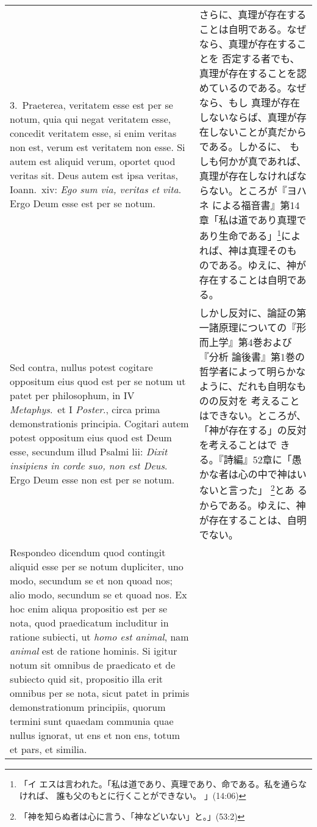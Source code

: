 \documentclass[10pt]{jsarticle}
\begin{document}
\begin{longtable}{p{21em}p{21em}}
\\

3.~{\sc Praeterea}, veritatem esse est per se notum, quia qui negat
veritatem esse, concedit veritatem esse, si enim veritas non est,
verum est veritatem non esse. Si autem est aliquid verum, oportet quod
veritas sit. Deus autem est ipsa veritas, Ioann.~{\sc xiv}: {\it Ego
sum via, veritas et vita}. Ergo Deum esse est per se notum.

&

さらに、真理が存在することは自明である。なぜなら、真理が存在することを
否定する者でも、真理が存在することを認めているのである。なぜなら、もし
真理が存在しないならば、真理が存在しないことが真だからである。しかるに、
もしも何かが真であれば、真理が存在しなければならない。ところが『ヨハネ
による福音書』第14章「私は道であり真理であり生命である」\footnote{「イ
エスは言われた。「私は道であり、真理であり、命である。私を通らなければ、
誰も父のもとに行くことができない。 」(14:06)}によれば、神は真理そのも
のである。ゆえに、神が存在することは自明である。

\\

{\sc Sed contra}, nullus potest cogitare oppositum eius quod est per
se notum ut patet per philosophum, in IV {\it Metaphys}.~et I {\it
Poster}., circa prima demonstrationis principia. Cogitari autem potest
oppositum eius quod est Deum esse, secundum illud Psalmi {\sc lii}:
{\it Dixit insipiens in corde suo, non est Deus}. Ergo Deum esse non
est per se notum.

&

しかし反対に、論証の第一諸原理についての『形而上学』第4巻および『分析
論後書』第1巻の哲学者によって明らかなように、だれも自明なものの反対を
考えることはできない。ところが、「神が存在する」の反対を考えることはで
きる。『詩編』52章に「愚かな者は心の中で神はいないと言った」
\footnote{「神を知らぬ者は心に言う、「神などいない」と。」(53:2)}とあ
るからである。ゆえに、神が存在することは、自明でない。

\\

{\sc Respondeo dicendum} quod contingit aliquid esse per se notum
dupliciter, uno modo, secundum se et non quoad nos; alio modo,
secundum se et quoad nos. Ex hoc enim aliqua propositio est per se
nota, quod praedicatum includitur in ratione subiecti, ut {\it homo
est animal}, nam {\it animal} est de ratione hominis. Si igitur notum
sit omnibus de praedicato et de subiecto quid sit, propositio illa
erit omnibus per se nota, sicut patet in primis demonstrationum
principiis, quorum termini sunt quaedam communia quae nullus ignorat,
ut ens et non ens, totum et pars, et similia.


\end{longtable}
\end{document}
